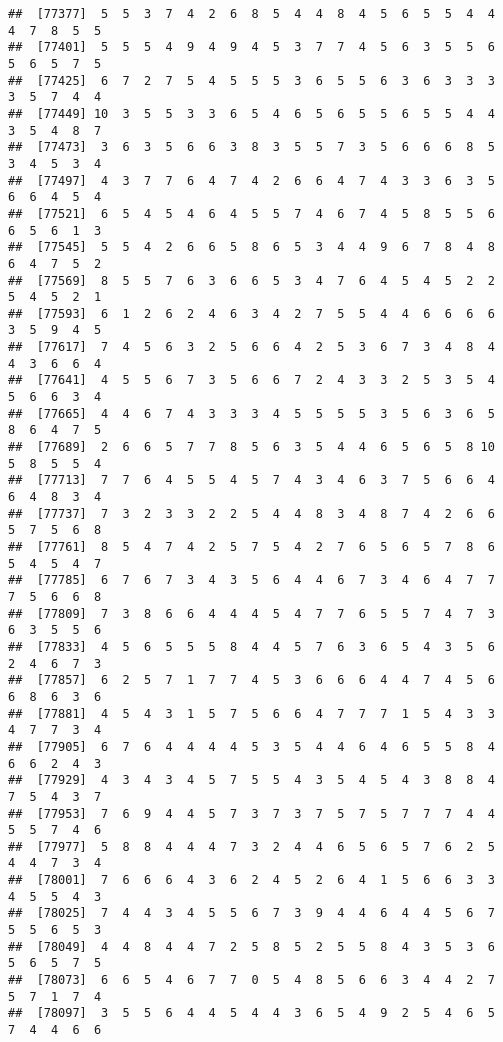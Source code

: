 \documentclass[
]{book}
\begin{document}
\begin{verbatim}
##  [77377]  5  5  3  7  4  2  6  8  5  4  4  8  4  5  6  5  5  4  4  4  7  8  5  5
##  [77401]  5  5  5  4  9  4  9  4  5  3  7  7  4  5  6  3  5  5  6  5  6  5  7  5
##  [77425]  6  7  2  7  5  4  5  5  5  3  6  5  5  6  3  6  3  3  3  3  5  7  4  4
##  [77449] 10  3  5  5  3  3  6  5  4  6  5  6  5  5  6  5  5  4  4  3  5  4  8  7
##  [77473]  3  6  3  5  6  6  3  8  3  5  5  7  3  5  6  6  6  8  5  3  4  5  3  4
##  [77497]  4  3  7  7  6  4  7  4  2  6  6  4  7  4  3  3  6  3  5  6  6  4  5  4
##  [77521]  6  5  4  5  4  6  4  5  5  7  4  6  7  4  5  8  5  5  6  6  5  6  1  3
##  [77545]  5  5  4  2  6  6  5  8  6  5  3  4  4  9  6  7  8  4  8  6  4  7  5  2
##  [77569]  8  5  5  7  6  3  6  6  5  3  4  7  6  4  5  4  5  2  2  5  4  5  2  1
##  [77593]  6  1  2  6  2  4  6  3  4  2  7  5  5  4  4  6  6  6  6  3  5  9  4  5
##  [77617]  7  4  5  6  3  2  5  6  6  4  2  5  3  6  7  3  4  8  4  4  3  6  6  4
##  [77641]  4  5  5  6  7  3  5  6  6  7  2  4  3  3  2  5  3  5  4  5  6  6  3  4
##  [77665]  4  4  6  7  4  3  3  3  4  5  5  5  5  3  5  6  3  6  5  8  6  4  7  5
##  [77689]  2  6  6  5  7  7  8  5  6  3  5  4  4  6  5  6  5  8 10  5  8  5  5  4
##  [77713]  7  7  6  4  5  5  4  5  7  4  3  4  6  3  7  5  6  6  4  6  4  8  3  4
##  [77737]  7  3  2  3  3  2  2  5  4  4  8  3  4  8  7  4  2  6  6  5  7  5  6  8
##  [77761]  8  5  4  7  4  2  5  7  5  4  2  7  6  5  6  5  7  8  6  5  4  5  4  7
##  [77785]  6  7  6  7  3  4  3  5  6  4  4  6  7  3  4  6  4  7  7  7  5  6  6  8
##  [77809]  7  3  8  6  6  4  4  4  5  4  7  7  6  5  5  7  4  7  3  6  3  5  5  6
##  [77833]  4  5  6  5  5  5  8  4  4  5  7  6  3  6  5  4  3  5  6  2  4  6  7  3
##  [77857]  6  2  5  7  1  7  7  4  5  3  6  6  6  4  4  7  4  5  6  6  8  6  3  6
##  [77881]  4  5  4  3  1  5  7  5  6  6  4  7  7  7  1  5  4  3  3  4  7  7  3  4
##  [77905]  6  7  6  4  4  4  4  5  3  5  4  4  6  4  6  5  5  8  4  6  6  2  4  3
##  [77929]  4  3  4  3  4  5  7  5  5  4  3  5  4  5  4  3  8  8  4  7  5  4  3  7
##  [77953]  7  6  9  4  4  5  7  3  7  3  7  5  7  5  7  7  7  4  4  5  5  7  4  6
##  [77977]  5  8  8  4  4  4  7  3  2  4  4  6  5  6  5  7  6  2  5  4  4  7  3  4
##  [78001]  7  6  6  6  4  3  6  2  4  5  2  6  4  1  5  6  6  3  3  4  5  5  4  3
##  [78025]  7  4  4  3  4  5  5  6  7  3  9  4  4  6  4  4  5  6  7  5  5  6  5  3
##  [78049]  4  4  8  4  4  7  2  5  8  5  2  5  5  8  4  3  5  3  6  5  6  5  7  5
##  [78073]  6  6  5  4  6  7  7  0  5  4  8  5  6  6  3  4  4  2  7  5  7  1  7  4
##  [78097]  3  5  5  6  4  4  5  4  4  3  6  5  4  9  2  5  4  6  5  7  4  4  6  6

\end{verbatim}
\end{document}
